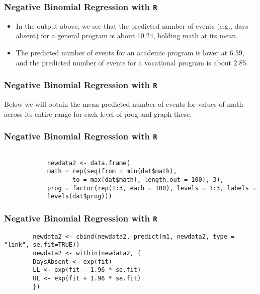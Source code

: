 \documentclass[MASTER.tex]{subfiles}
\begin{document}
\begin{frame}[fragile]
	\frametitle{Negative Binomial Regression with \texttt{R} }
	\Large
	
\begin{itemize}
\item In the output above, we see that the predicted number of events (e.g., days absent) for a general program is about 
10.24, holding math at its mean. 
\item The predicted number of events for an academic program is lower at 6.59, and the predicted number of events for a vocational program is about 2.85.
\end{itemize}
\end{frame}
	\begin{frame}[fragile]
		\frametitle{Negative Binomial Regression with \texttt{R} }
		\Large	
	Below we will obtain the mean predicted number of events for values of math across its entire range for each level of prog and graph these.
	\end{frame}

		\begin{frame}[fragile]
		\frametitle{Negative Binomial Regression with \texttt{R} }
		\large
		
		\begin{framed}
		\begin{verbatim}
		
			newdata2 <- data.frame(
			math = rep(seq(from = min(dat$math), 
			       to = max(dat$math), length.out = 100), 3),
			prog = factor(rep(1:3, each = 100), levels = 1:3, labels =
			levels(dat$prog)))
		\end{verbatim}	
		\end{framed}
		
		
		\end{frame}
	\begin{frame}[fragile]
	\frametitle{Negative Binomial Regression with \texttt{R} }
	\large
	
	\begin{verbatim}
		newdata2 <- cbind(newdata2, predict(m1, newdata2, type = "link", se.fit=TRUE))
		newdata2 <- within(newdata2, {
		DaysAbsent <- exp(fit)
		LL <- exp(fit - 1.96 * se.fit)
		UL <- exp(fit + 1.96 * se.fit)
		})
	\end{verbatim}

\end{frame}
\end{document}

